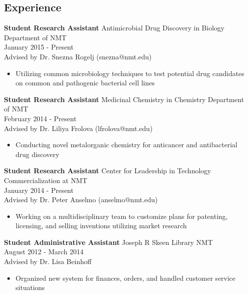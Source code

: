 \documentclass[margin]{res}
\begin{document}
\begin{resume}
\section{Experience}
{\bf Student Research Assistant}
Antimicrobial Drug Discovery in Biology Department of NMT\\
January 2015 - Present\\
Advised by Dr. Snezna Rogelj (snezna@nmt.edu)
\begin{itemize} \itemsep -2pt %
\item Utilizing common microbiology techniques to test potential drug candidates on common and pathogenic bacterial cell lines
\end{itemize}

 {\bf Student Research Assistant}
 Medicinal Chemistry in Chemistry Department of NMT\\
 February 2014 - Present\\
 Advised by Dr. Liliya Frolova (lfrolova@nmt.edu)
 \begin{itemize} \itemsep -2pt  %
 \item Conducting novel metalorganic chemistry for anticancer and antibacterial drug discovery
 \end{itemize}
 
{\bf Student Research Assistant}
 Center for Leadership in Technology Commercialization at NMT\\
 January 2014 - Present\\
 Advised by Dr. Peter Anselmo (anselmo@nmt.edu)
\begin{itemize} \itemsep -2pt %
\item Working on a multidisciplinary team to customize plans for patenting, licensing, and selling inventions utilizing market research
\end{itemize}

{\bf Student Administrative Assistant}
Joseph R Skeen Library NMT\\
 August 2012 - March 2014\\
 Advised by Dr. Lisa Beinhoff             
 \begin{itemize} \itemsep -2pt %
  \item  Organized new system for finances, orders, and handled customer service situations
  \end{itemize}


\end{resume}
\end{document}
